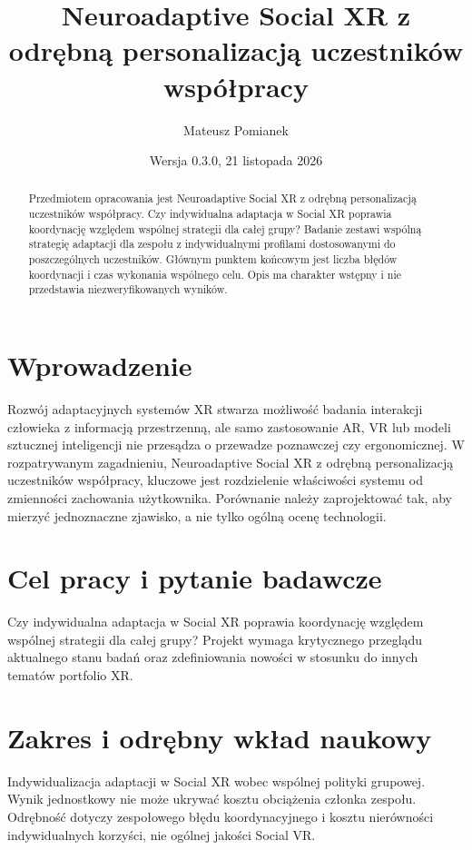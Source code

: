 \documentclass[11pt,a4paper]{article}
\title{Neuroadaptive Social XR z odrębną personalizacją uczestników współpracy}
\author{Mateusz Pomianek}
\date{Wersja 0.3.0, 21 listopada 2026}
\begin{document}
\maketitle

\begin{abstract}

Przedmiotem opracowania jest Neuroadaptive Social XR z odrębną personalizacją uczestników współpracy. Czy indywidualna adaptacja w Social XR poprawia koordynację względem wspólnej strategii dla całej grupy? Badanie zestawi wspólną strategię adaptacji dla zespołu z indywidualnymi profilami dostosowanymi do poszczególnych uczestników. Głównym punktem końcowym jest liczba błędów koordynacji i czas wykonania wspólnego celu. Opis ma charakter wstępny i nie przedstawia niezweryfikowanych wyników.

\end{abstract}

\section{Wprowadzenie}

Rozwój adaptacyjnych systemów XR stwarza możliwość badania interakcji człowieka z informacją przestrzenną, ale samo zastosowanie AR, VR lub modeli sztucznej inteligencji nie przesądza o przewadze poznawczej czy ergonomicznej. W rozpatrywanym zagadnieniu, Neuroadaptive Social XR z odrębną personalizacją uczestników współpracy, kluczowe jest rozdzielenie właściwości systemu od zmienności zachowania użytkownika. Porównanie należy zaprojektować tak, aby mierzyć jednoznaczne zjawisko, a nie tylko ogólną ocenę technologii.

\section{Cel pracy i pytanie badawcze}

Czy indywidualna adaptacja w Social XR poprawia koordynację względem wspólnej strategii dla całej grupy? Projekt wymaga krytycznego przeglądu aktualnego stanu badań oraz zdefiniowania nowości w stosunku do innych tematów portfolio XR.

\section{Zakres i odrębny wkład naukowy}
Indywidualizacja adaptacji w Social XR wobec wspólnej polityki grupowej. Wynik jednostkowy nie może ukrywać kosztu obciążenia członka zespołu. Odrębność dotyczy zespołowego błędu koordynacyjnego i kosztu nierówności indywidualnych korzyści, nie ogólnej jakości Social VR.
\end{document}
